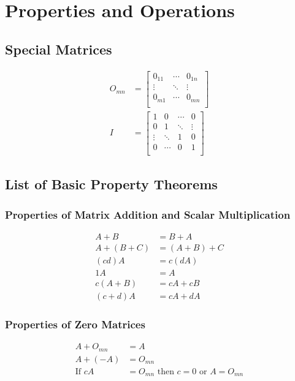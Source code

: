 \documentclass[]{article}
\begin{document}
\section{Properties and Operations}
\subsection{Special Matrices}
	\begin{align*}
		O_{mn} &=
			\begin{bmatrix}
				0_{11} & \cdots & 0_{1n} \\
				\vdots & \ddots & \vdots \\
				0_{m1 }& \cdots & 0_{mn} \\
			\end{bmatrix}
		\\
		I &=
			\begin{bmatrix}
				1      & 0      & \cdots & 0      \\
				0      & 1      & \ddots & \vdots \\
				\vdots & \ddots & 1      & 0      \\
				0      & \cdots & 0      & 1      \\
			\end{bmatrix}
	\end{align*}
\subsection{List of Basic Property Theorems}
\subsubsection{Properties of Matrix Addition and Scalar Multiplication}
	\begin{align}
		A + B &= B + A \\
		A + (B + C) &= (A + B) + C \\
		(cd)A &= c(dA) \\
		1A &= A \\
		c(A + B) &= cA + cB \\
		(c + d)A &= cA + dA
	\end{align}
\subsubsection{Properties of Zero Matrices}
	\begin{align}
		A + O_{mn} &= A \\
		A + (-A) &= O_{mn} \\ 
		\text{If } cA &= O_{mn} \text{ then } c = 0 \text{ or } A = O_{mn}
	\end{align}
\end{document}
